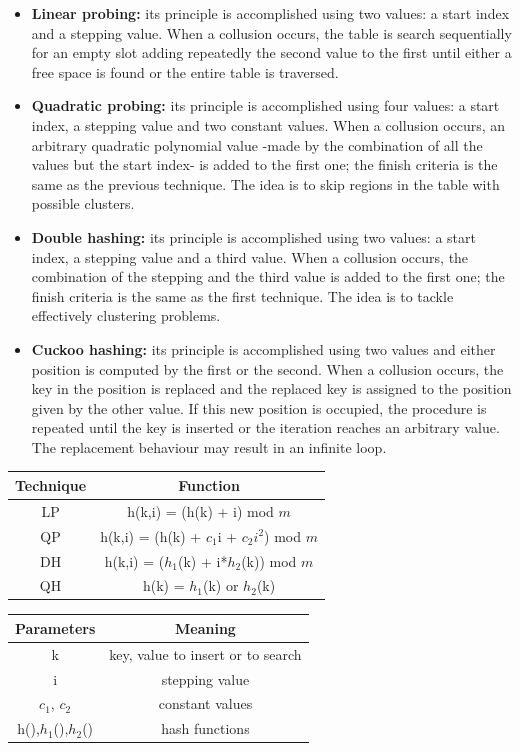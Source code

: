 \documentclass{article}
\begin{document}
\begin{itemize}
    \item \textbf{Linear probing:} its principle is accomplished using two values: a start index and a stepping value. When a collusion occurs, the table is search sequentially for an empty slot adding repeatedly the second value to the first until either a free space is found or the entire table is traversed.
    \item \textbf{Quadratic probing:} its principle is accomplished using four values: a start index, a stepping value and two constant values. When a collusion occurs, an arbitrary quadratic polynomial value -made by the combination of all the values but the start index- is added to the first one; the finish criteria is the same as the previous technique. The idea is to skip regions in the table with possible clusters.
    \item \textbf{Double hashing:} its principle is accomplished using two values: a start index, a stepping value and a third value. When a collusion occurs, the combination of the stepping and the third value is added to the first one; the finish criteria is the same as the first technique. The idea is to tackle effectively clustering problems.
    \item \textbf{Cuckoo hashing:} its principle is accomplished using two values and either position is computed by the first or the second. When a collusion occurs, the key in the position is replaced and the replaced key is assigned to the position given by the other value. If this new position is occupied, the procedure is repeated until the key is inserted or the iteration reaches an arbitrary value. The replacement behaviour may result in an infinite loop. 
\end{itemize}
\begin{center}
\begin{tabular}{c|c}
    Technique & Function\\
\hline
    LP & h(k,i) = (h(k) + i) mod $m$ \\
\hline
    QP & h(k,i) = (h(k) + $c_1$i + $c_2i^2$) mod $m$ \\
\hline
    DH & h(k,i) = ($h_1$(k) + i*$h_2$(k)) mod $m$ \\
\hline
    QH & h(k) = $h_1$(k) or $h_2$(k) \\
\end{tabular}

\begin{tabular}{c|c}
    Parameters & Meaning \\
\hline
    k & key, value to insert or to search \\
\hline
    i & stepping value \\
\hline
    $c_1$, $c_2$ & constant values \\
\hline
    h(),$h_1$(),$h_2$() & hash functions \\
\end{tabular}
\end{center}
\end{document}
